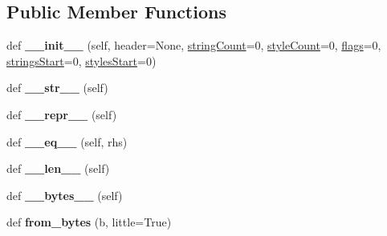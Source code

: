 \subsection*{Public Member Functions}
\begin{DoxyCompactItemize}
\item 
\mbox{\label{classstringpool_1_1ResStringPool__header_afa01cad679c5ae35255eb5a8b2d4828f}} 
def {\bfseries \+\_\+\+\_\+init\+\_\+\+\_\+} (self, header=None, \mbox{\hyperlink{classstringpool_1_1ResStringPool__header_ae6af60c9dce1d1f9aac441e56252f1e8}{string\+Count}}=0, \mbox{\hyperlink{classstringpool_1_1ResStringPool__header_aebdb909df469bc34c3dbfa47cbe2797f}{style\+Count}}=0, \mbox{\hyperlink{classstringpool_1_1ResStringPool__header_a03c15e4b87b3e8d019ad6f91ac232d2e}{flags}}=0, \mbox{\hyperlink{classstringpool_1_1ResStringPool__header_ae692079b25bbe4f8c3567d7fd9939b61}{strings\+Start}}=0, \mbox{\hyperlink{classstringpool_1_1ResStringPool__header_a1dfb17978a7354dc36b71393611ae610}{styles\+Start}}=0)
\item 
\mbox{\label{classstringpool_1_1ResStringPool__header_acb560830e53713fa5d9be2fb3ecbe71b}} 
def {\bfseries \+\_\+\+\_\+str\+\_\+\+\_\+} (self)
\item 
\mbox{\label{classstringpool_1_1ResStringPool__header_ac7bf43e1936c979b170aca63c7c70498}} 
def {\bfseries \+\_\+\+\_\+repr\+\_\+\+\_\+} (self)
\item 
\mbox{\label{classstringpool_1_1ResStringPool__header_a4cecad1b61e53c4e3786a4b47d3b825d}} 
def {\bfseries \+\_\+\+\_\+eq\+\_\+\+\_\+} (self, rhs)
\item 
\mbox{\label{classstringpool_1_1ResStringPool__header_ae07e149804078e5027014bbe34198bb2}} 
def {\bfseries \+\_\+\+\_\+len\+\_\+\+\_\+} (self)
\item 
\mbox{\label{classstringpool_1_1ResStringPool__header_a00e94f8b16b37fd7bd9354a52e5fb3b3}} 
def {\bfseries \+\_\+\+\_\+bytes\+\_\+\+\_\+} (self)
\item 
\mbox{\label{classstringpool_1_1ResStringPool__header_af4c59222a03938f92ae0da3ada5f5194}} 
def {\bfseries from\+\_\+bytes} (b, little=True)
\end{DoxyCompactItemize}
